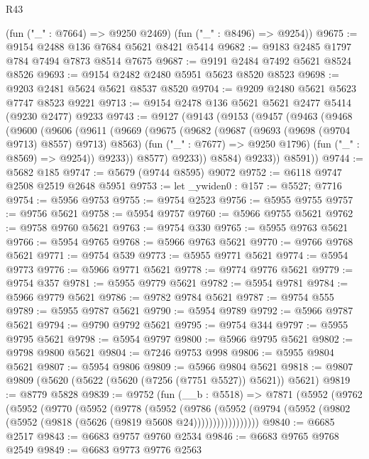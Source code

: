 \begin{lexlean}{R43}
\begin{coremodule}
      (fun ("_" : @7664) => @9250 @2469)
      (fun ("_" : @8496) => @9254))
@9675 := @9154 @2488 @136 @7684 @5621 @8421 @5414
@9682 := @9183 @2485 @1797 @784 @7494 @7873 @8514 @7675
@9687 := @9191 @2484 @7492 @5621 @8524 @8526
@9693 := @9154 @2482 @2480 @5951 @5623 @8520 @8523
@9698 := @9203 @2481 @5624 @5621 @8537 @8520
@9704 := @9209 @2480 @5621 @5623 @7747 @8523 @9221
@9713 := @9154 @2478 @136 @5621 @5621 @2477 @5414 (@9230 @2477) @9233
@9743 := @9127
    (@9143
      (@9153
        (@9457
          (@9463
            (@9468
              (@9600
                (@9606
                  (@9611
                    (@9669
                      (@9675
                        (@9682
                          (@9687 (@9693 (@9698 (@9704 @9713) @8557) @9713) @8563)
                          (fun ("_" : @7677) => @9250 @1796)
                          (fun ("_" : @8569) => @9254))
                        @9233))
                    @8577)
                  @9233))
              @8584)
            @9233))
        @8591))
@9744 := @5682 @185
@9747 := @5679 (@9744 @8595) @9072
@9752 := @6118 @9747 @2508 @2519 @2648 @5951
@9753 := let _ywiden0 : @157 := @5527; @7716
@9754 := @5956 @9753
@9755 := @9754 @2523
@9756 := @5955 @9755
@9757 := @9756 @5621
@9758 := @5954 @9757
@9760 := @5966 @9755 @5621
@9762 := @9758 @9760 @5621
@9763 := @9754 @330
@9765 := @5955 @9763 @5621
@9766 := @5954 @9765
@9768 := @5966 @9763 @5621
@9770 := @9766 @9768 @5621
@9771 := @9754 @539
@9773 := @5955 @9771 @5621
@9774 := @5954 @9773
@9776 := @5966 @9771 @5621
@9778 := @9774 @9776 @5621
@9779 := @9754 @357
@9781 := @5955 @9779 @5621
@9782 := @5954 @9781
@9784 := @5966 @9779 @5621
@9786 := @9782 @9784 @5621
@9787 := @9754 @555
@9789 := @5955 @9787 @5621
@9790 := @5954 @9789
@9792 := @5966 @9787 @5621
@9794 := @9790 @9792 @5621
@9795 := @9754 @344
@9797 := @5955 @9795 @5621
@9798 := @5954 @9797
@9800 := @5966 @9795 @5621
@9802 := @9798 @9800 @5621
@9804 := @7246 @9753 @998
@9806 := @5955 @9804 @5621
@9807 := @5954 @9806
@9809 := @5966 @9804 @5621
@9818 := @9807 @9809 (@5620 (@5622 (@5620 (@7256 (@7751 @5527)) @5621)) @5621)
@9819 := @8779 @5828
@9839 := @9752
    (fun (__b : @5518) =>
    @7871
      (@5952
        (@9762
          (@5952
            (@9770
              (@5952
                (@9778
                  (@5952
                    (@9786
                      (@5952
                        (@9794 (@5952 (@9802 (@5952 (@9818 (@5626 (@9819 @5608 @24)))))))))))))))))
@9840 := @6685 @2517
@9843 := @6683 @9757 @9760 @2534
@9846 := @6683 @9765 @9768 @2549
@9849 := @6683 @9773 @9776 @2563

\end{coremodule}
\end{lexlean}
